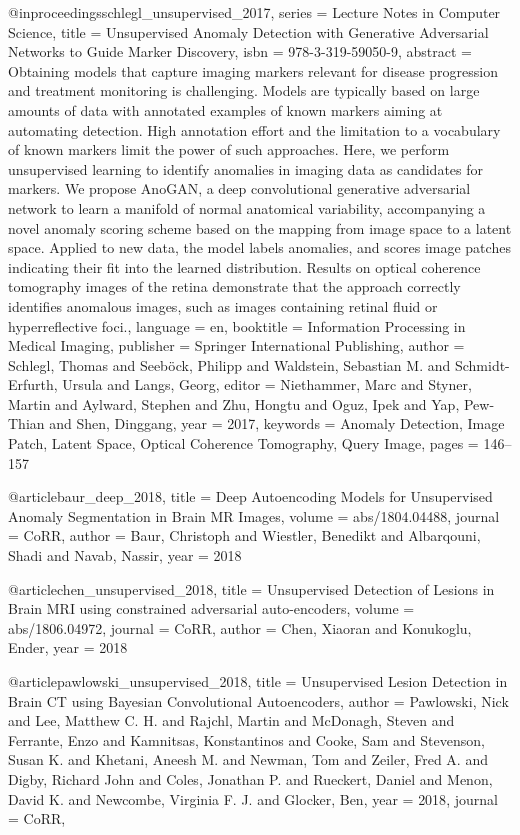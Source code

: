 \documentclass{article}
\begin{document}
@inproceedings{schlegl_unsupervised_2017,
	series = {Lecture {Notes} in {Computer} {Science}},
	title = {Unsupervised {Anomaly} {Detection} with {Generative} {Adversarial} {Networks} to {Guide} {Marker} {Discovery}},
	isbn = {978-3-319-59050-9},
	abstract = {Obtaining models that capture imaging markers relevant for disease progression and treatment monitoring is challenging. Models are typically based on large amounts of data with annotated examples of known markers aiming at automating detection. High annotation effort and the limitation to a vocabulary of known markers limit the power of such approaches. Here, we perform unsupervised learning to identify anomalies in imaging data as candidates for markers. We propose AnoGAN, a deep convolutional generative adversarial network to learn a manifold of normal anatomical variability, accompanying a novel anomaly scoring scheme based on the mapping from image space to a latent space. Applied to new data, the model labels anomalies, and scores image patches indicating their fit into the learned distribution. Results on optical coherence tomography images of the retina demonstrate that the approach correctly identifies anomalous images, such as images containing retinal fluid or hyperreflective foci.},
	language = {en},
	booktitle = {Information {Processing} in {Medical} {Imaging}},
	publisher = {Springer International Publishing},
	author = {Schlegl, Thomas and Seeböck, Philipp and Waldstein, Sebastian M. and Schmidt-Erfurth, Ursula and Langs, Georg},
	editor = {Niethammer, Marc and Styner, Martin and Aylward, Stephen and Zhu, Hongtu and Oguz, Ipek and Yap, Pew-Thian and Shen, Dinggang},
	year = {2017},
	keywords = {Anomaly Detection, Image Patch, Latent Space, Optical Coherence Tomography, Query Image},
	pages = {146--157}
}

@article{baur_deep_2018,
	title = {Deep {Autoencoding} {Models} for {Unsupervised} {Anomaly} {Segmentation} in {Brain} {MR} {Images}},
	volume = {abs/1804.04488},
	journal = {CoRR},
	author = {Baur, Christoph and Wiestler, Benedikt and Albarqouni, Shadi and Navab, Nassir},
	year = {2018}
}

@article{chen_unsupervised_2018,
	title = {Unsupervised {Detection} of {Lesions} in {Brain} {MRI} using constrained adversarial auto-encoders},
	volume = {abs/1806.04972},
	journal = {CoRR},
	author = {Chen, Xiaoran and Konukoglu, Ender},
	year = {2018}
}

@article{pawlowski_unsupervised_2018,
	title = {Unsupervised {Lesion} {Detection} in {Brain} {CT} using {Bayesian} {Convolutional} {Autoencoders}},
	author = {Pawlowski, Nick and Lee, Matthew C. H. and Rajchl, Martin and McDonagh, Steven and Ferrante, Enzo and Kamnitsas, Konstantinos and Cooke, Sam and Stevenson, Susan K. and Khetani, Aneesh M. and Newman, Tom and Zeiler, Fred A. and Digby, Richard John and Coles, Jonathan P. and Rueckert, Daniel and Menon, David K. and Newcombe, Virginia F. J. and Glocker, Ben},
	year = {2018},
	journal = {CoRR},
}
\end{document}
